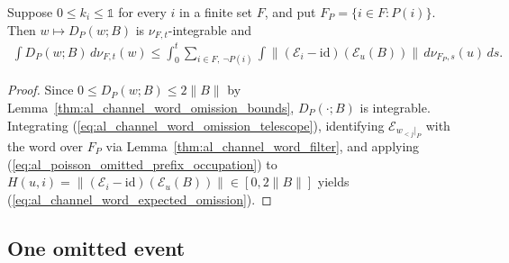 \begin{lemma}
    \label{thm:al_channel_word_expected_omission}
    \leanok
    Suppose $0\le k_i\le\mathbb 1$ for every $i$ in a finite set $F$, and put
    $F_P=\{i\in F:P(i)\}$. Then $w\mapsto D_P(w;B)$ is $\nu_{F,t}$-integrable
    and
    \begin{align}
        \int D_P(w;B)\,d\nu_{F,t}(w)
        \le\int_0^t\sum_{i\in F,\ \neg P(i)}\int
        \|(\mathcal E_i-\mathrm{id})(\mathcal E_u(B))\|\,d\nu_{F_P,s}(u)\,ds.
        \label{eq:al_channel_word_expected_omission}
    \end{align}
\end{lemma}
\begin{proof}\leanok
    Since $0\le D_P(w;B)\le 2\|B\|$ by Lemma~\ref{thm:al_channel_word_omission_bounds},
    $D_P(\cdot;B)$ is integrable. Integrating (\ref{eq:al_channel_word_omission_telescope}),
    identifying $\mathcal E_{w_{<j}|_P}$ with the word over $F_P$ via
    Lemma~\ref{thm:al_channel_word_filter}, and applying
    (\ref{eq:al_poisson_omitted_prefix_occupation}) to
    $H(u,i)=\|(\mathcal E_i-\mathrm{id})(\mathcal E_u(B))\|\in[0,2\|B\|]$ yields
    (\ref{eq:al_channel_word_expected_omission}).
\end{proof}

\subsection{One omitted event}

